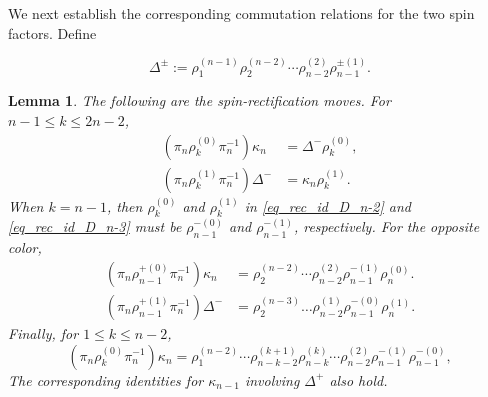 \documentclass[a4paper]{amsart}
\newtheorem{lem}[thm]{Lemma}
\theoremstyle{remark}
\numberwithin{equation}{section}
\begin{document}
We next establish the corresponding commutation relations for the two spin
factors. Define

\[
 \Delta^\pm:=
 \rho_1^{(n-1)}\rho_2^{(n-2)}\cdots
 \rho_{n-2}^{(2)}\rho_{n-1}^{\pm(1)}.
\]


\begin{lem}\label{lem_com_ru}
The following are the spin-rectification moves.  For
$n-1\leq k\leq2n-2$,
\begin{align}
 (\pi_n\rho_k^{(0)}\pi_n^{-1})\kappa_n
   &=\Delta^-\rho_k^{(0)},
 \label{eq_rec_id_D_n-2}\\
 (\pi_n\rho_k^{(1)}\pi_n^{-1})\Delta^-
   &=\kappa_n\rho_k^{(1)}.
 \label{eq_rec_id_D_n-3}
\end{align}
When $k=n-1$, then $\rho_k^{(0)}$ and $\rho_k^{(1)}$ in \eqref{eq_rec_id_D_n-2} and \eqref{eq_rec_id_D_n-3} must be
$\rho_{n-1}^{-(0)}$ and $\rho_{n-1}^{-(1)}$, respectively.  For the
opposite color,
\begin{align}
 (\pi_n\rho_{n-1}^{+(0)}\pi_n^{-1})\kappa_n
 &=\rho_2^{(n-2)}\cdots\rho_{n-2}^{(2)}
  \rho_{n-1}^{-(1)}\rho_n^{(0)}.
 \label{eq:spin-opposite}\\
 (\pi_n\rho_{n-1}^{+(1)}\pi_n^{-1})\Delta^-
 &=\rho_2^{(n-3)}\dots\rho_{n-2}^{(1)}\rho_{n-1}^{-(0)}\rho_n^{(1)}.
 \label{eq:spin-opposite_1}
\end{align}
Finally, for $1\leq k\leq n-2$,
\begin{equation}
 (\pi_n\rho_k^{(0)}\pi_n^{-1})\kappa_n
 =\rho_1^{(n-2)}\cdots\rho_{n-k-2}^{(k+1)}
  \rho_{n-k}^{(k)}\cdots\rho_{n-2}^{(2)}
  \rho_{n-1}^{-(1)}\rho_{n-1}^{-(0)},
 \label{eq:spin-small}
\end{equation}
The corresponding identities for
$\kappa_{n-1}$ involving $\Delta^+$ also hold.
\end{lem}
\end{document}
